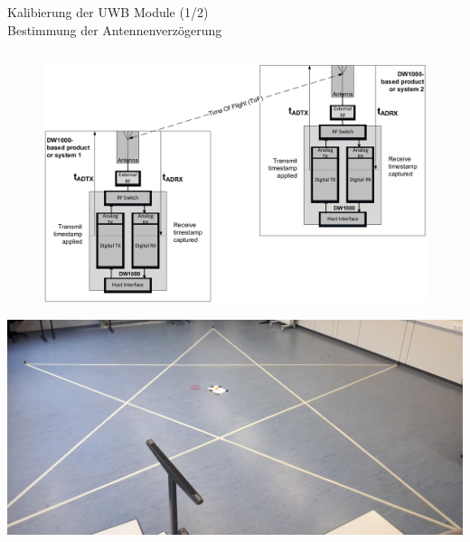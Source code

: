 \documentclass{beamer}
\begin{document}
%
%
\begin{frame}{Kalibierung der UWB Module (1/2)\\\normalsize{Bestimmung der Antennenverzögerung}}
	\begin{columns}
		\begin{column}{0.5\linewidth}
			\centering


			\begin{overlayarea}{\linewidth}{.4\textheight}
				\only<1>
				{
					\begin{figure}
						\includegraphics[width=\linewidth]{decawave2014calibration_fig1}
						\caption{\cite{decawave2014calibration}}
					\end{figure}
				}
				{
					\includegraphics[width=\linewidth]{calibration_pentagram2}
}
\end{overlayarea}
\end{column}
\end{columns}
\end{frame}
\end{document}
